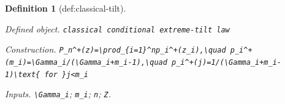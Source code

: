 \documentclass{article}
\newtheorem{definition}{Definition}
\begin{document}
\begin{definition}[def:classical-tilt]\label{def:classical-tilt}
\par\smallskip\noindent\emph{Defined object.} \texttt{classical conditional extreme-\allowbreak{}tilt law}
\par\smallskip\noindent\emph{Construction.} \texttt{P\_\allowbreak{}n\textasciicircum{}+\allowbreak{}(z)=\allowbreak{}\textbackslash{}\allowbreak{}prod\_\allowbreak{}\{i=\allowbreak{}1\}\allowbreak{}\textasciicircum{}np\_\allowbreak{}i\textasciicircum{}+\allowbreak{}(z\_\allowbreak{}i),\allowbreak{}\textbackslash{}\allowbreak{}quad p\_\allowbreak{}i\textasciicircum{}+\allowbreak{}(m\_\allowbreak{}i)=\allowbreak{}\textbackslash{}\allowbreak{}Gamma\_\allowbreak{}i/\allowbreak{}(\textbackslash{}\allowbreak{}Gamma\_\allowbreak{}i+\allowbreak{}m\_\allowbreak{}i-\allowbreak{}1),\allowbreak{}\textbackslash{}\allowbreak{}quad p\_\allowbreak{}i\textasciicircum{}+\allowbreak{}(j)=\allowbreak{}1/\allowbreak{}(\textbackslash{}\allowbreak{}Gamma\_\allowbreak{}i+\allowbreak{}m\_\allowbreak{}i-\allowbreak{}1)\textbackslash{}\allowbreak{}text\{ for \}\allowbreak{}j<m\_\allowbreak{}i}
\par\smallskip\noindent\emph{Inputs.} \texttt{\textbackslash{}\allowbreak{}Gamma\_\allowbreak{}i}; \texttt{m\_\allowbreak{}i}; \texttt{n}; \texttt{Z}.
\end{definition}
\end{document}
